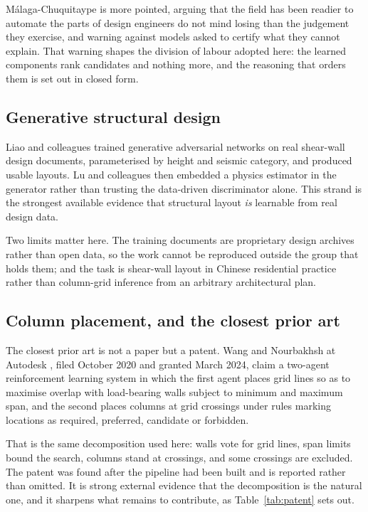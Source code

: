 M\'alaga-Chuquitaype \citep{malaga2022opinionated} is more pointed,
arguing that the field has been readier to automate the parts of design
engineers do not mind losing than the judgement they exercise, and warning
against models asked to certify what they cannot explain. That warning
shapes the division of labour adopted here: the learned components rank
candidates and nothing more, and the reasoning that orders them is set out
in closed form.

\subsection{Generative structural design}

Liao and colleagues \citep{liao2021shearwallgan} trained generative
adversarial networks on real shear-wall design documents, parameterised by
height and seismic category, and produced usable layouts. Lu and
colleagues \citep{lu2022physicsgan} then embedded a physics estimator in
the generator rather than trusting the data-driven discriminator alone.
This strand is the strongest available evidence that structural layout
\emph{is} learnable from real design data.

Two limits matter here. The training documents are proprietary design
archives rather than open data, so the work cannot be reproduced outside
the group that holds them; and the task is shear-wall layout in Chinese
residential practice rather than column-grid inference from an arbitrary
architectural plan.

\subsection{Column placement, and the closest prior art}
\label{sec:priorart}

The closest prior art is not a paper but a patent. Wang and Nourbakhsh at
Autodesk \citep{wang2024columnrl}, filed October 2020 and granted March
2024, claim a two-agent reinforcement learning system in which the first
agent places grid lines so as to maximise overlap with load-bearing walls
subject to minimum and maximum span, and the second places columns at grid
crossings under rules marking locations as required, preferred, candidate
or forbidden.

That is the same decomposition used here: walls vote for grid lines, span
limits bound the search, columns stand at crossings, and some crossings
are excluded. The patent was found after the pipeline had been built and is
reported rather than omitted. It is strong external evidence that the
decomposition is the natural one, and it sharpens what remains to
contribute, as Table~\ref{tab:patent} sets out.

